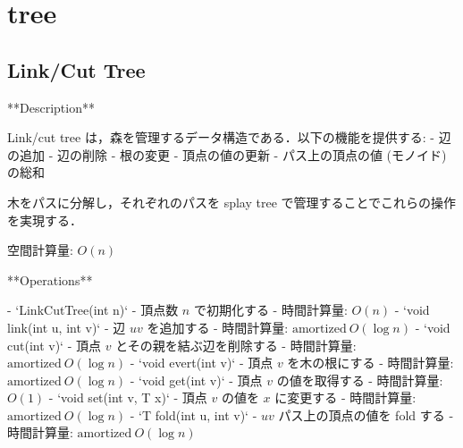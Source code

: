 \section{tree}

\subsection{Link/Cut Tree}

\begin{small}
\begin{markdown}
**Description**

Link/cut tree は，森を管理するデータ構造である．以下の機能を提供する:
- 辺の追加
- 辺の削除
- 根の変更
- 頂点の値の更新
- パス上の頂点の値 (モノイド) の総和

木をパスに分解し，それぞれのパスを splay tree で管理することでこれらの操作を実現する．

空間計算量: $O(n)$

**Operations**

- `LinkCutTree(int n)`
    - 頂点数 $n$ で初期化する
    - 時間計算量: $O(n)$
- `void link(int u, int v)`
    - 辺 $uv$ を追加する
    - 時間計算量: $\mathrm{amortized}\ O(\log n)$
- `void cut(int v)`
    - 頂点 $v$ とその親を結ぶ辺を削除する
    - 時間計算量: $\mathrm{amortized}\ O(\log n)$
- `void evert(int v)`
    - 頂点 $v$ を木の根にする
    - 時間計算量: $\mathrm{amortized}\ O(\log n)$
- `void get(int v)`
    - 頂点 $v$ の値を取得する
    - 時間計算量: $O(1)$
- `void set(int v, T x)`
    - 頂点 $v$ の値を $x$ に変更する
    - 時間計算量: $\mathrm{amortized}\ O(\log n)$
- `T fold(int u, int v)`
    - $uv$ パス上の頂点の値を fold する
    - 時間計算量: $\mathrm{amortized}\ O(\log n)$

\end{markdown}
\end{small}


